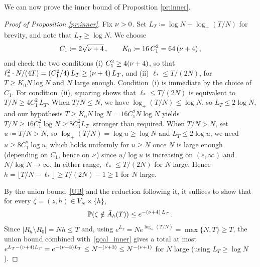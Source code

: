\documentclass[11pt,a4paper,reqno]{amsart}
\theoremstyle{definition}
\newcommand{\bbP}{{\ensuremath{\mathbb P}} }
\begin{document}
We can now prove the inner bound of Proposition \ref{pr:inner}.


\begin{proof}[Proof of Proposition \ref{pr:inner}]
Fix $\nu > 0$. Set $L_T \coloneqq \log N + \log_+(T/N)$ for brevity, and note that $L_T \geq \log N$. We choose
\[
  C_1 \coloneqq 2\sqrt{\nu+4}\,,\qquad K_0 \coloneqq 16\, C_1^2 = 64\,(\nu+4)\,,
\]
and check the two conditions (i) $C_1^2 \geq 4(\nu + 4)$, so that $\ell_*^2 \cdot N/(4T) = (C_1^2/4)\, L_T \geq (\nu + 4)\, L_T$, and (ii) $\ell_* \leq T/(2N)$, for $T \geq K_0 N \log N$ and $N$ large enough. Condition~(i) is immediate by the choice of $C_1$. For condition~(ii), squaring shows that $\ell_* \leq T/(2N)$ is equivalent to $T/N \geq 4 C_1^2\, L_T$. When $T/N \leq N$, we have $\log_+(T/N) \leq \log N$, so $L_T \leq 2\log N$, and our hypothesis $T \geq K_0 N \log N = 16 C_1^2 N \log N$ yields $T/N \geq 16 C_1^2 \log N \geq 8 C_1^2 L_T$, stronger than required. When $T/N > N$, set $u \coloneqq T/N > N$, so $\log_+(T/N) = \log u \geq \log N$ and $L_T \leq 2 \log u$; we need $u \geq 8 C_1^2 \log u$, which holds uniformly for $u \geq N$ once $N$ is large enough (depending on $C_1$, hence on $\nu$) since $u / \log u$ is increasing on $(e, \infty)$ and $N/\log N \to \infty$. In either range, $\ell_* \leq T/(2N)$ for $N$ large. Hence $h = \lfloor T/N - \ell_*\rfloor \geq T/(2N) - 1 \geq 1$ for $N$ large.

By the union bound~\eqref{UB} and the reduction following it, it suffices to show that for every $\zeta = (z, h) \in V_N \times \{h\}$,
	\begin{equation}\label{goal_inner}
	\bbP( \zeta \notin \bar A_h(T) ) \leq e^{-(\n + 4)\,L_T}\,.
	\end{equation}
Since $|R_h\setminus R_0| = Nh \leq T$ and, using $e^{L_T} = N e^{\log_+(T/N)} = \max\{N, T\} \geq T$, the union bound combined with~\eqref{goal_inner} gives a total at most $e^{L_T - (\nu+4) L_T} = e^{-(\nu+3) L_T} \leq N^{-(\nu+3)} \leq N^{-(\nu+1)}$ for $N$ large (using $L_T \geq \log N$).


\end{proof}
\end{document}
